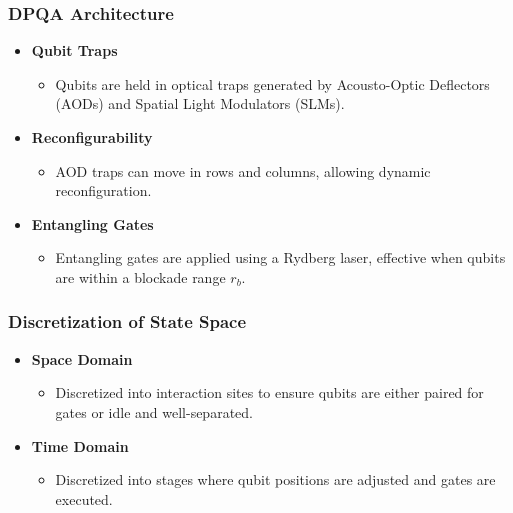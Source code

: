 \documentclass[18 pt]{beamer}
\begin{document}
\begin{frame}
    \frametitle{DPQA Architecture}
    \begin{itemize}
        \item \textbf{Qubit Traps}
        \begin{itemize}
            \item Qubits are held in optical traps generated by Acousto-Optic Deflectors (AODs) and Spatial Light Modulators (SLMs).
        \end{itemize}
        \item \textbf{Reconfigurability}
        \begin{itemize}
            \item AOD traps can move in rows and columns, allowing dynamic reconfiguration.
        \end{itemize}
        \item \textbf{Entangling Gates}
        \begin{itemize}
            \item Entangling gates are applied using a Rydberg laser, effective when qubits are within a blockade range \( r_b \).
        \end{itemize}
    \end{itemize}
\end{frame}

\begin{frame}
    \frametitle{Discretization of State Space}
    \begin{itemize}
        \item \textbf{Space Domain}
        \begin{itemize}
            \item Discretized into interaction sites to ensure qubits are either paired for gates or idle and well-separated.
        \end{itemize}
        \item \textbf{Time Domain}
        \begin{itemize}
            \item Discretized into stages where qubit positions are adjusted and gates are executed.
        \end{itemize}
    \end{itemize}
\end{frame}
\end{document}
